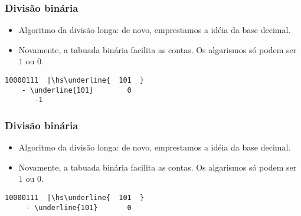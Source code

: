\documentclass{beamer}
\begin{document}
\begin{frame}[fragile]
\frametitle{Divisão binária}

\begin{itemize}
\item Algoritmo da divisão longa: de novo, emprestamos a idéia da base decimal.

\item Novamente, a tabuada binária facilita as contas. Os algarismos só podem ser $1$ ou $0$.
\end{itemize}

\def\hs{\hspace{-1mm}}

\begin{Verbatim}[commandchars=\\\{\},codes={\catcode`$=3\catcode`^=7}]
      10000111  |\hs\underline{  101  }
    - \underline{101}        0
       -1
\end{Verbatim}

\end{frame}


\begin{frame}[fragile]
\frametitle{Divisão binária}

\begin{itemize}
\item Algoritmo da divisão longa: de novo, emprestamos a idéia da base decimal.

\item Novamente, a tabuada binária facilita as contas. Os algarismos só podem ser $1$ ou $0$.
\end{itemize}

\def\hs{\hspace{-1mm}}

\begin{Verbatim}[commandchars=\\\{\},codes={\catcode`$=3\catcode`^=7}]
      10000111  |\hs\underline{  101  }
     - \underline{101}       0
        
\end{Verbatim}

\end{frame}


\end{document}
